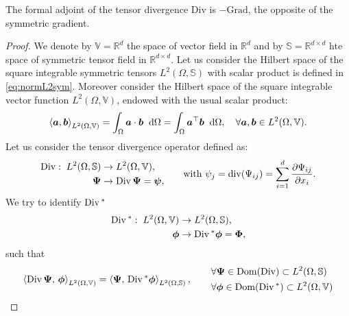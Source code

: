 \begin{theorem}\label{th:adjDiv}
	The formal adjoint of the tensor divergence $\mathrm{Div}$ is $- \mathrm{Grad}$, the opposite of the symmetric gradient.
	\begin{proof}
		We denote by $\mathbb{V} = \mathbb{R}^{d}$ the space of vector field in $\mathbb{R}^{d}$ and by $\mathbb{S} = \mathbb{R}^{d\times d}$ hte space of symmetric tensor field in $\mathbb{R}^{d\times d}$. Let us consider the Hilbert space of the square integrable symmetric tensors $L^2(\Omega, \mathbb{S})$ with scalar product is defined in \eqref{eq:normL2sym}. Moreover consider the Hilbert space of the square integrable vector function $L^2(\Omega, \mathbb{V})$, endowed with the usual scalar product:
		\begin{equation*}
		\left\langle \bm{a} , \bm{b} \right\rangle_{L^2(\Omega, \mathbb{V})} = \int_{\Omega}  \bm{a} \cdot \bm{b} \; \d\Omega = \int_{\Omega} \bm{a}^\top \bm{b}\; \d\Omega, \quad \forall \bm{a}, \bm{b} \in L^2(\Omega, \mathbb{V}). 
		\end{equation*}
		Let us consider the tensor divergence operator defined as:
		\begin{equation*}
		\begin{aligned}
		\Div: \; L^2(\Omega, \mathbb{S})& \rightarrow L^2(\Omega, \mathbb{V}), \\
		\bm{\Psi}& \rightarrow \Div\bm{\Psi} = \bm{\psi}, \\
		\end{aligned}
		\qquad \text{with } \psi_j = \mathrm{div}(\Psi_{ij}) = \sum_{i = 1}^d \diffp{\Psi_{ij}}{x_i}.
		\end{equation*}
		We try to identify $\operatorname*{Div}{}^*$
		\begin{equation*}
		\begin{aligned}
		\operatorname*{Div}{}^*: \; L^2(\Omega, \mathbb{V}) & \rightarrow L^2(\Omega, \mathbb{S}), \\
		\bm{\phi}& \rightarrow  \operatorname*{Div}{}^* \bm{\phi} = \bm{\Phi}, \\
		\end{aligned}
		\end{equation*}
		such that \begin{equation*}
		\inner[{L^2(\Omega, \mathbb{V})}]{\Div \bm{\Psi}}{\bm{\phi}}  = \inner[{L^2(\Omega, \mathbb{S})}]{\bm{\Psi}} {\Div{}^* \bm{\phi}},
		\begin{aligned} \qquad
		&\forall \bm{\Psi} \in \Dom(\Div) \subset L^2(\Omega, \mathbb{S}) \\
		&\forall \bm{\phi} \in \Dom(\Div{}^*) \subset L^2(\Omega, \mathbb{V})

\end{aligned}
\end{equation*}
\end{proof}
\end{theorem}
